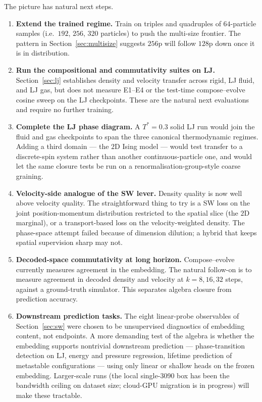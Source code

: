 \documentclass[11pt]{article}
\begin{document}
The picture has natural next steps.

\begin{enumerate}[leftmargin=*, itemsep=2pt, topsep=2pt]
  \item \textbf{Extend the trained regime.} Train on triples and quadruples of $64$-particle samples (i.e.\ $192$, $256$, $320$ particles) to push the multi-size frontier. The pattern in Section~\ref{sec:multisize} suggests $256$p will follow $128$p down once it is in distribution.
  \item \textbf{Run the compositional and commutativity suites on LJ.} Section~\ref{sec:lj} establishes density and velocity transfer across rigid, LJ fluid, and LJ gas, but does not measure E1--E4 or the test-time compose--evolve cosine sweep on the LJ checkpoints. These are the natural next evaluations and require no further training.
  \item \textbf{Complete the LJ phase diagram.} A $T^* = 0.3$ solid LJ run would join the fluid and gas checkpoints to span the three canonical thermodynamic regimes. Adding a third domain --- the $2$D Ising model --- would test transfer to a discrete-spin system rather than another continuous-particle one, and would let the same closure tests be run on a renormalisation-group-style coarse graining.
  \item \textbf{Velocity-side analogue of the SW lever.} Density quality is now well above velocity quality. The straightforward thing to try is a SW loss on the joint position-momentum distribution restricted to the spatial slice (the $2$D marginal), or a transport-based loss on the velocity-weighted density. The phase-space attempt failed because of dimension dilution; a hybrid that keeps spatial supervision sharp may not.
  \item \textbf{Decoded-space commutativity at long horizon.} Compose--evolve currently measures agreement in the embedding. The natural follow-on is to measure agreement in decoded density and velocity at $k = 8, 16, 32$ steps, against a ground-truth simulator. This separates algebra closure from prediction accuracy.
  \item \textbf{Downstream prediction tasks.} The eight linear-probe observables of Section~\ref{sec:sw} were chosen to be unsupervised diagnostics of embedding content, not endpoints. A more demanding test of the algebra is whether the embedding supports nontrivial downstream prediction --- phase-transition detection on LJ, energy and pressure regression, lifetime prediction of metastable configurations --- using only linear or shallow heads on the frozen embedding. Larger-scale runs (the local single-3090 box has been the bandwidth ceiling on dataset size; cloud-GPU migration is in progress) will make these tractable.
\end{enumerate}
\end{document}
